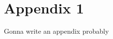 \documentclass[twocolumn]{aastex62}
\newcommand{\Gus}[1]{\textcolor{red}{#1}}
\newcommand{\kms}{\text{km}/\text{s}}
\begin{document}


\appendix \section{Appendix 1}
Gonna write an appendix probably 


\end{document}
